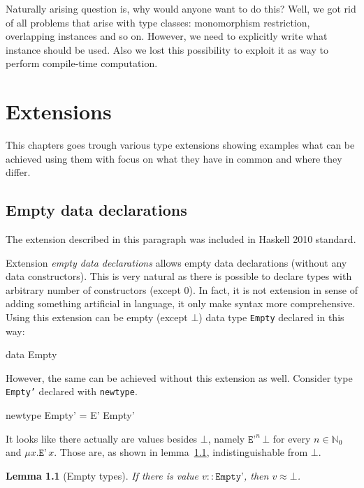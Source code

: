 \documentclass[11pt,oneside,draft]{fithesis2}
\newtheorem{lemma}{Lemma}
\theoremstyle{definition}
\begin{document}
Naturally arising question is, why would anyone want to do this?
Well, we got rid of all problems that arise with type classes:
monomorphism restriction, overlapping instances and so on.
However, we need to explicitly write what instance should be used.
Also we lost this possibility
to exploit it as way to perform compile-time computation.

\chapter{Extensions}

This chapters goes trough various type extensions showing examples
what can be achieved using them with focus on what they have in common
and where they differ.

\section{Empty data declarations}

The extension described in this paragraph was included in Haskell 2010 standard.

Extension \emph{empty data declarations} allows empty data declarations
(without any data constructors). This is very natural as there is possible
to declare types with arbitrary number of constructors (except 0). In
fact, it is not extension in sense of adding something artificial in
language, it only make syntax more comprehensive. Using this extension can
be empty (except \(\bot\)) data type \texttt{Empty} declared in this way:
\begin{code}
data Empty
\end{code}
However, the same can be achieved without this extension as well. Consider type \texttt{Empty'}
declared with \texttt{newtype}.
\begin{code}
newtype Empty' = E' Empty'
\end{code}
It looks like there actually are values besides \(\bot\), namely \(\texttt{E'}^n \, \bot\)
for every \(n \in \mathbb{N}_0\) and \(\mu x . \texttt{E'} \, x\).
Those are, as shown in lemma~\ref{emptyTypes}, indistinguishable from \(\bot\).

\begin{lemma}[Empty types]
\label{emptyTypes}
If there is value \(v :: \texttt{Empty'}\), then \(v \approx \bot\).
\end{lemma}
\end{document}
